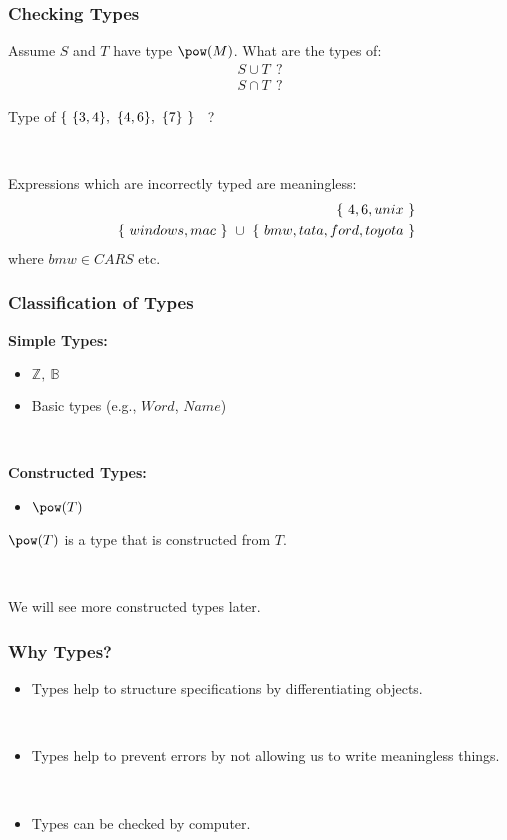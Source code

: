 \documentclass{beamer}
\begin{document}
\begin{frame}

\frametitle{Checking Types}

Assume $S$ and $T$ have type $\power(M)$. What are the types of:
\begin{eqnarray*}
    S \cup T ~~?\\
    S \cap T ~~?
\end{eqnarray*}


Type of $\{~ \{3,4\},~ \{4,6\},~ \{7\} ~\}$~ ?

~

Expressions which are incorrectly typed are meaningless:
\begin{eqnarray*}
    &&\{~ 4, 6, unix ~\} \\
    &&\{~windows, mac ~\} ~\cup~ \{~ bmw, tata, ford, toyota~\}
\end{eqnarray*}
where $bmw \in CARS$ etc.
\end{frame}





\begin{frame}
\frametitle{Classification of Types}

{\bf Simple Types:}
\begin{itemize}\setlength{\itemsep}{0pt}
\item $\mathbb{Z},~  \mathbb{B}$
 \item Basic types
(e.g., $Word$, $Name$) 
\end{itemize}

~

{\bf Constructed Types:} ~~
\begin{itemize}\setlength{\itemsep}{0pt}
\item $\power(T)$
\end{itemize}

$\power(T)$ is a type that is \alert{constructed} from $T$. 

~

We will see more constructed types later.
\end{frame}





\begin{frame}

\frametitle{Why Types?}
\begin{itemize}
\item Types help to structure specifications by differentiating objects.

~

\item Types help to prevent errors by not allowing
 us to write meaningless things.

~

\item Types can be checked by computer.
\end{itemize}


\end{frame}
\end{document}
